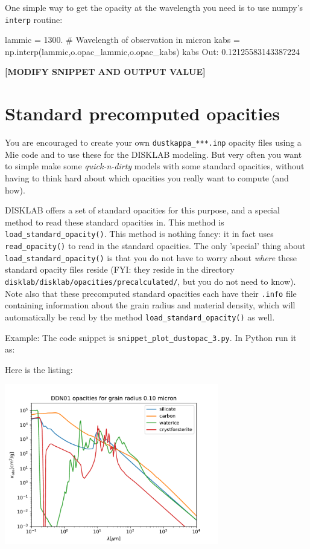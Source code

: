 \documentclass{book}
\newcommand{\code}[1]{{\small\tt #1}}
\begin{document}
One simple way to get the opacity at the wavelength you need is
to use numpy's \code{interp} routine:
\begin{codebox}
lammic = 1300.    # Wavelength of observation in micron
kabs   = np.interp(lammic,o.opac_lammic,o.opac_kabs)
kabs
Out: 0.12125583143387224
\end{codebox}

{\bf [MODIFY SNIPPET AND OUTPUT VALUE]}


\section{Standard precomputed opacities}
\label{sec-standard-opacities}
%
You are encouraged to create your own \code{dustkappa\_***.inp}
opacity files using a Mie code and to use these for the {\sf DISKLAB}
modeling. But very often you want to simple make some
{\em quick-n-dirty} models with some standard opacities, without
having to think hard about which opacities you really want to
compute (and how).

{\sf DISKLAB} offers a set of standard opacities for this
purpose, and a special method to read these standard opacities
in. This method is \code{load\_standard\_opacity()}.
This method is nothing fancy: it in fact uses
\code{read\_opacity()} to read in the standard opacities.
The only 'special' thing about \code{load\_standard\_opacity()} is
that you do not have to worry about {\em where} these standard
opacity files reside (FYI: they reside in the directory
\code{disklab/disklab/opacities/precalculated/}, but you do not need to know).
Note also that these precomputed standard opacities each
have their \code{.info} file containing information about
the grain radius and material density, which will automatically
be read by the method \code{load\_standard\_opacity()} as well.

Example: The code snippet is
\code{snippet\_plot\_dustopac\_3.py}. In Python run it as:
\begin{codebox}
\end{codebox}
Here is the listing:

\centerline{\includegraphics[width=0.7\textwidth]{../snippets/fig_snippet_plot_dustopac_3_1.pdf}}
\end{document}
